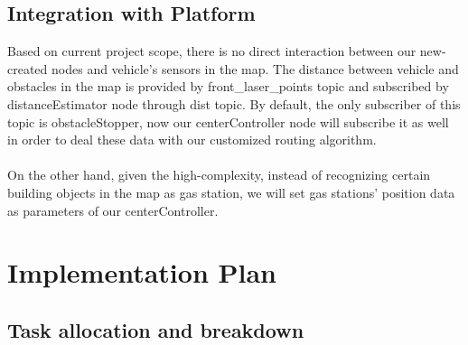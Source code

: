 \documentclass[12pt,onecolumn,titlepage]{article}
\begin{document}
\subsection{Integration with Platform}

\noindent Based on current project scope, there is no direct interaction between our new-created nodes and vehicle's sensors in the map. The distance between vehicle and obstacles in the map is provided by front\_laser\_points topic and subscribed by distanceEstimator node through dist topic. By default, the only subscriber of this topic is obstacleStopper, now our centerController node will subscribe it as well in order to deal these data with our customized routing algorithm.\\
\\
\noindent On the other hand, given the high-complexity, instead of recognizing certain building objects in the map as gas station, we will set gas stations' position data as parameters of our centerController.

\section{Implementation Plan}
\subsection{Task allocation and breakdown}
\end{document}
